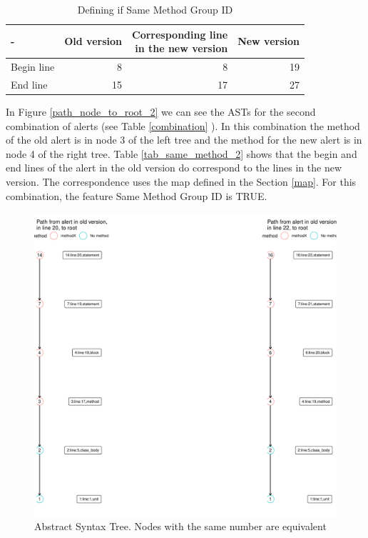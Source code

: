 \documentclass[
]{article}
\begin{document}
\normalsize

\small

\begin{table}[H]

\caption{\label{tab:unnamed-chunk-9}Defining if Same Method Group ID \label{tab_same_method}}
\centering
\begin{tabular}[t]{l|r|r|r}
\hline
- & Old version & \makecell[l]{Corresponding line\\in the new version} & New version\\
\hline
Begin line & 8 & 8 & 19\\
\hline
End line & 15 & 17 & 27\\
\hline
\end{tabular}
\end{table}

\normalsize

In Figure \ref{path_node_to_root_2} we can see the ASTs for the second
combination of alerts (see Table \ref{combination} ). In this
combination the method of the old alert is in node 3 of the left tree
and the method for the new alert is in node 4 of the right tree. Table
\ref{tab_same_method_2} shows that the begin and end lines of the alert
in the old version do correspond to the lines in the new version. The
correspondence uses the map defined in the Section \ref{map}. For this
combination, the feature Same Method Group ID is TRUE.

\small

\begin{figure}[H]
\includegraphics[width=1\linewidth]{report_files/figure-latex/unnamed-chunk-10-1} \caption{Abstract Syntax Tree. Nodes with the same number are equivalent \label{path_node_to_root_2}}\label{fig:unnamed-chunk-10}
\end{figure}
\end{document}
